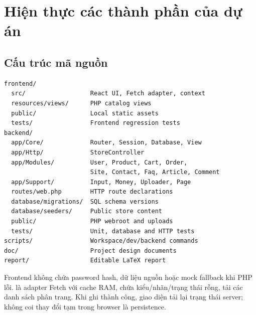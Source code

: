 \section{Hiện thực các thành phần của dự án}
\label{sec:implementation}
\subsection{Cấu trúc mã nguồn}
\begin{lstlisting}[caption={Cấu trúc thư mục rút gọn đã đối chiếu},label={lst:structure}]
frontend/
  src/                  React UI, Fetch adapter, context
  resources/views/      PHP catalog views
  public/               Local static assets
  tests/                Frontend regression tests
backend/
  app/Core/             Router, Session, Database, View
  app/Http/             StoreController
  app/Modules/          User, Product, Cart, Order,
                        Site, Contact, Faq, Article, Comment
  app/Support/          Input, Money, Uploader, Page
  routes/web.php        HTTP route declarations
  database/migrations/  SQL schema versions
  database/seeders/     Public store content
  public/               PHP webroot and uploads
  tests/                Unit, database and HTTP tests
scripts/                Workspace/dev/backend commands
doc/                    Project design documents
report/                 Editable LaTeX report
\end{lstlisting}
Frontend không chứa password hash, dữ liệu nguồn hoặc mock fallback khi PHP lỗi.  là adapter Fetch với cache RAM,  chứa kiểu/nhãn/trạng thái rỗng,  tải các danh sách phân trang. Khi ghi thành công, giao diện tải lại trạng thái server; không coi thay đổi tạm trong browser là persistence.

